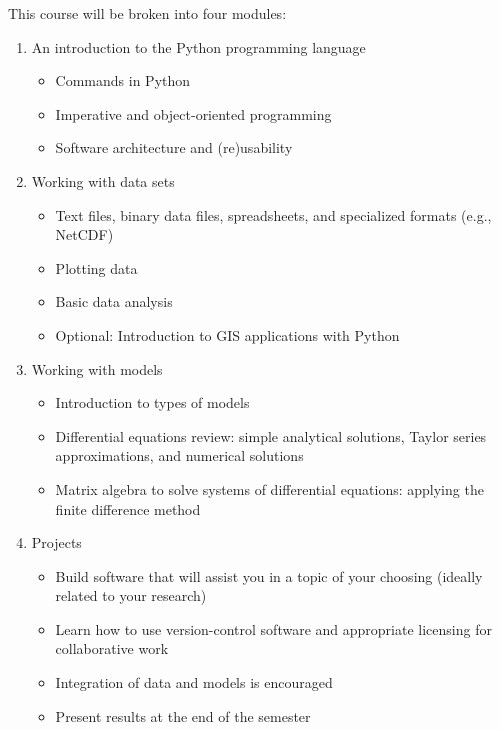 \documentclass[10pt,a4paper]{amsart}
\begin{document}
This course will be broken into four modules:
\begin{enumerate}
\item An introduction to the Python programming language
	\begin{itemize}
	\item Commands in Python
	\item Imperative and object-oriented programming
	\item Software architecture and (re)usability
	\end{itemize}
\item Working with data sets
	\begin{itemize}
	\item Text files, binary data files, spreadsheets, and specialized formats (e.g., NetCDF)
	\item Plotting data
	\item Basic data analysis
	\item Optional: Introduction to GIS applications with Python
	\end{itemize}
\item Working with models
	\begin{itemize}
	\item Introduction to types of models
	\item Differential equations review: simple analytical solutions, Taylor series approximations, and numerical solutions
	\item Matrix algebra to solve systems of differential equations: applying the finite difference method
	\end{itemize}
\item Projects
	\begin{itemize}
	\item Build software that will assist you in a topic of your choosing (ideally related to your research)
	\item Learn how to use version-control software and appropriate licensing for collaborative work
	\item Integration of data and models is encouraged
	\item Present results at the end of the semester
	\end{itemize}
\end{enumerate}
\end{document}
